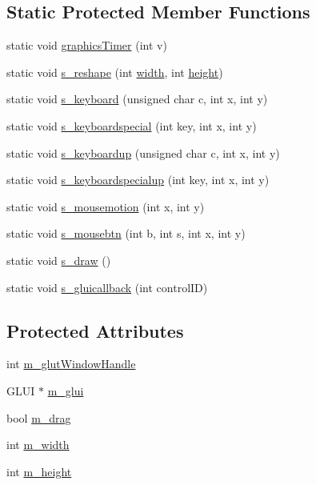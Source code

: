 \subsection*{Static Protected Member Functions}
\begin{DoxyCompactItemize}
\item 
static void \hyperlink{classBaseGfxApp_a73c82d9170ffded2289883a8e47628a1}{graphics\-Timer} (int v)
\item 
static void \hyperlink{classBaseGfxApp_a5fe6a77d37044cbe28647ed3391bbb7a}{s\-\_\-reshape} (int \hyperlink{classBaseGfxApp_ace089a1a94fb6bb0bc17e1b7fa48e05d}{width}, int \hyperlink{classBaseGfxApp_aa253dbe16a20c40e0a1bf8ff942ceea3}{height})
\item 
static void \hyperlink{classBaseGfxApp_a52edb2569227319feb68779844e7d857}{s\-\_\-keyboard} (unsigned char c, int x, int y)
\item 
static void \hyperlink{classBaseGfxApp_a1e8d90a4faab60300ddf2a4ea9b83115}{s\-\_\-keyboardspecial} (int key, int x, int y)
\item 
static void \hyperlink{classBaseGfxApp_aa1ca205af9d6cee33949f2e6adf4c923}{s\-\_\-keyboardup} (unsigned char c, int x, int y)
\item 
static void \hyperlink{classBaseGfxApp_a0e4dfe006f3cc9126c1cc8ad32784f75}{s\-\_\-keyboardspecialup} (int key, int x, int y)
\item 
static void \hyperlink{classBaseGfxApp_a5e640f2394f7e038d0dd2b469d5c2e24}{s\-\_\-mousemotion} (int x, int y)
\item 
static void \hyperlink{classBaseGfxApp_a22dd953bfb75add9fd0f8f2f8be535c5}{s\-\_\-mousebtn} (int b, int s, int x, int y)
\item 
static void \hyperlink{classBaseGfxApp_a58415c6151a2a80e1fe2eaa9919a4dab}{s\-\_\-draw} ()
\item 
static void \hyperlink{classBaseGfxApp_ad4a963321f1147d68369225ab0c7f32f}{s\-\_\-gluicallback} (int control\-I\-D)
\end{DoxyCompactItemize}
\subsection*{Protected Attributes}
\begin{DoxyCompactItemize}
\item 
int \hyperlink{classBaseGfxApp_ad8697d6fdd10e6f336c3a662016b4fa7}{m\-\_\-glut\-Window\-Handle}
\item 
G\-L\-U\-I $\ast$ \hyperlink{classBaseGfxApp_a6eb1673b80283727221da2242211af1d}{m\-\_\-glui}
\item 
bool \hyperlink{classBaseGfxApp_a2e70a389224f8affe7c137f7e20dc8c1}{m\-\_\-drag}
\item 
int \hyperlink{classBaseGfxApp_a7e5ef1c8f25fe081b4a1fd4ce6a96e07}{m\-\_\-width}
\item 
int \hyperlink{classBaseGfxApp_ac078e4fc20b5c2fe0c744966b850b412}{m\-\_\-height}
\end{DoxyCompactItemize}

